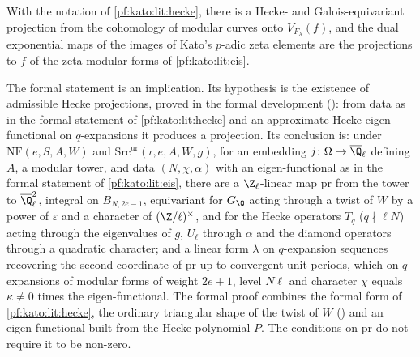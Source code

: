 \begin{littheorem}\label{pf:kato:lit:proj}
With the notation of \cref{pf:kato:lit:hecke}, there is a Hecke- and Galois-equivariant projection from the cohomology of modular curves
onto $V_{F_\lambda}(f)$, and the dual exponential maps of the images of Kato's $p$-adic zeta elements are the projections to $f$ of the zeta
modular forms of \cref{pf:kato:lit:eis}.
\end{littheorem}

\begin{remark}\label{pf:kato:rem:proj}
The formal statement is an implication. Its hypothesis is the existence of admissible Hecke projections, proved in the formal
development (): from data as in the formal statement of
\cref{pf:kato:lit:hecke} and an approximate Hecke eigen-functional on $q$-expansions it produces a projection. Its conclusion is: under
$\mathrm{NF}(e,S,A,W)$ and $\mathrm{Src}^{\mathrm{ur}}(\iota,e,A,W,g)$, for an embedding $j\colon\Omega\to\katoQlb$ defining $A$, a modular
tower, and data $(N,\chi,\alpha)$ with an eigen-functional as in the formal statement of \cref{pf:kato:lit:eis}, there are a
$\Z_\ell$-linear map $\mathrm{pr}$ from the tower to $\katoQlb^2$, integral on $B_{N,2e-1}$, equivariant for $G_\Q$ acting through a twist of
$W$ by a power of $\varepsilon$ and a character of $(\Z/\ell)^\times$, and for the Hecke operators $T_q$ ($q\nmid\ell N$) acting through the
eigenvalues of $g$, $U_\ell$ through $\alpha$ and the diamond operators through a quadratic character; and a linear form $\lambda$ on
$q$-expansion sequences recovering the second coordinate of $\mathrm{pr}$ up to convergent unit periods, which on $q$-expansions of
modular forms of weight $2e+1$, level $N\ell$ and character $\chi$ equals $\kappa\ne0$ times the eigen-functional. The formal proof
combines the formal form of \cref{pf:kato:lit:hecke}, the ordinary triangular shape of the twist of $W$
() and an eigen-functional built from the Hecke
polynomial $P$. The conditions on $\mathrm{pr}$ do not require it to be non-zero.
\end{remark}

